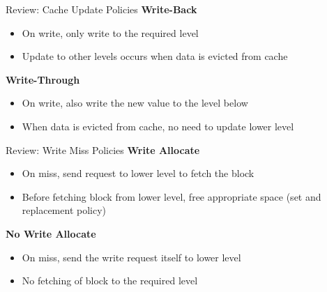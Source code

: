 \documentclass[aspectratio=169,12pt]{beamer}
\begin{document}
\begin{frame}{Review: Cache Update Policies}
\textbf{Write-Back}
\begin{itemize}
    \item On write, only write to the required level
    \item Update to other levels occurs when data is evicted from cache
\end{itemize}

\textbf{Write-Through}
\begin{itemize}
    \item On write, also write the new value to the level below
    \item When data is evicted from cache, no need to update lower level
\end{itemize}

\begin{center}
\end{center}
\end{frame}

\begin{frame}{Review: Write Miss Policies}
\textbf{Write Allocate}
\begin{itemize}
    \item On miss, send request to lower level to fetch the block
    \item Before fetching block from lower level, free appropriate space (set and replacement policy)
\end{itemize}

\textbf{No Write Allocate}
\begin{itemize}
    \item On miss, send the write request itself to lower level
    \item No fetching of block to the required level
\end{itemize}

\begin{center}
\end{center}
\end{frame}
\end{document}
